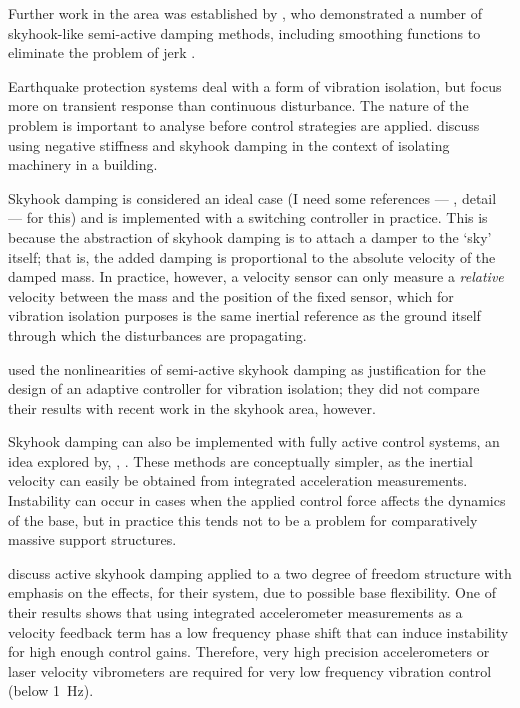 Further work in the area was established by \textcite{liu2002}, who demonstrated a number of skyhook-like semi-active damping methods, including smoothing functions to eliminate the problem of jerk
\cite{liu2005}.

Earthquake protection systems deal with a form of vibration isolation, but focus more on transient response than continuous disturbance.
The nature of the problem is important to analyse before control
strategies are applied.
\textcite{gavin2007} discuss using negative stiffness and skyhook damping in the context of isolating machinery in a building.

Skyhook damping is considered an ideal case (I need some references — \ie, detail — for this) and is implemented with a switching controller in practice.
This is because the abstraction of skyhook damping is to attach a damper to the `sky' itself; that is, the added damping is proportional to the absolute velocity of the damped mass.
In practice, however, a velocity sensor can only measure a \emph{relative} velocity between the mass and the position of the fixed sensor, which for vibration isolation purposes is the same inertial reference as the ground itself through which the disturbances are propagating.

\textcite{song2007} used the nonlinearities of semi-active skyhook damping as justification for the design of an adaptive controller for vibration isolation; they did not compare their results with recent work in the skyhook area, however.

Skyhook damping can also be implemented with fully active control systems, an idea explored by, \eg, \textcite{elliott2001,elliott2004,yan2006,kim2008-iecst} .
These methods are conceptually simpler, as the inertial velocity can easily be obtained from integrated acceleration measurements.
Instability can occur in cases when the applied control force affects the dynamics of the base, but in practice this tends not to be a problem for comparatively massive support structures.

\textcite{serrand2000} discuss active skyhook damping applied to a two degree of freedom structure with emphasis on the effects, for their system, due to possible base flexibility.
One of their results shows that using integrated accelerometer measurements as a velocity feedback term has a low frequency phase shift that can induce instability for high enough control gains.
Therefore, very high precision accelerometers or laser velocity vibrometers are required for very low frequency vibration control (below \SI{1}{Hz}).

